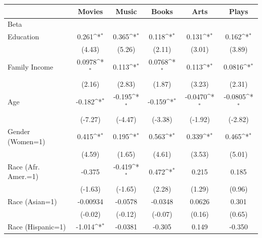 {
\def\sym#1{\ifmmode^{#1}\else\(^{#1}\)\fi}
\begin{longtable}{l*{5}{c}}
\toprule\endfirsthead\midrule\endhead\midrule\endfoot\endlastfoot
                    &\multicolumn{1}{c}{Movies}&\multicolumn{1}{c}{Music}&\multicolumn{1}{c}{Books}&\multicolumn{1}{c}{Arts}&\multicolumn{1}{c}{Plays}\\
\midrule
Beta                &                   &                   &                   &                   &                   \\
Education           &       0.261\sym{*}&       0.365\sym{*}&       0.118\sym{*}&       0.131\sym{*}&       0.162\sym{*}\\
                    &      (4.43)       &      (5.26)       &      (2.11)       &      (3.01)       &      (3.89)       \\
Family Income       &      0.0978\sym{*}&       0.113\sym{*}&      0.0768\sym{*}&       0.113\sym{*}&      0.0816\sym{*}\\
                    &      (2.16)       &      (2.83)       &      (1.87)       &      (3.23)       &      (2.31)       \\
Age                 &      -0.182\sym{*}&      -0.195\sym{*}&      -0.159\sym{*}&     -0.0470\sym{*}&     -0.0805\sym{*}\\
                    &     (-7.27)       &     (-4.47)       &     (-3.38)       &     (-1.92)       &     (-2.82)       \\
Gender (Women=1)    &       0.415\sym{*}&       0.195\sym{*}&       0.563\sym{*}&       0.339\sym{*}&       0.465\sym{*}\\
                    &      (4.59)       &      (1.65)       &      (4.61)       &      (3.53)       &      (5.01)       \\
Race (Afr. Amer.=1) &      -0.375       &      -0.419\sym{*}&       0.472\sym{*}&       0.215       &       0.185       \\
                    &     (-1.63)       &     (-1.65)       &      (2.28)       &      (1.29)       &      (0.96)       \\
Race (Asian=1)      &    -0.00934       &     -0.0578       &     -0.0348       &      0.0626       &       0.301       \\
                    &     (-0.02)       &     (-0.12)       &     (-0.07)       &      (0.16)       &      (0.65)       \\
Race (Hispanic=1)   &      -1.014\sym{*}&     -0.0381       &      -0.305       &       0.149       &      -0.350       \\

\end{longtable}}
